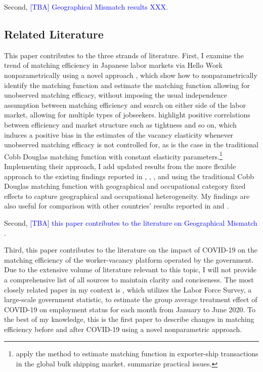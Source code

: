 \documentclass[12pt]{article}
\begin{document}
Second, \textcolor{blue}{[TBA] Geographical Mismatch results XXX}.


\subsection{Related Literature}
This paper contributes to the three strands of literature.
First, I examine the trend of matching efficiency in Japanese labor markets via Hello Work nonparametrically using a novel approach \citep{lange2020beyond}, which show how to nonparametrically identify the matching function and estimate the matching function allowing for unobserved matching efficacy, without imposing the usual independence assumption between matching efficiency and search on either side of the labor market, allowing for multiple types of jobseekers.
\cite{lange2020beyond} highlight positive correlations between efficiency and market structure such as tightness and so on, which induces a positive bias in the estimates of the vacancy elasticity whenever unobserved matching efficacy is not controlled for, as is the case in the traditional Cobb Douglas matching function with constant elasticity parameters.\footnote{\cite{brancaccio2020geography,brancaccio2023search} apply the method to estimate matching function in exporter-ship transactions in the global bulk shipping market. \cite{brancaccio2020guide} summarize practical issues.} 
Implementing their approach, I add updated results from the more flexible approach to the existing findings reported in \cite{kano2005estimating}, \cite{kambayashi2006vacancy}, \cite{sasaki2008matching}, and \cite{higashi2018spatial} using the traditional Cobb Douglas matching function with geographical and occupational category fixed effects to capture geographical and occupational heterogeneity.
My findings are also useful for comparison with other countries' results reported in \cite{bernstein2022matching} and \cite{petrongolo2001looking}.

Second, \textcolor{blue}{[TBA] this paper contributes to the literature on Geographical Mismatch \cite{csahin2014mismatch,kawata2016multi,kawata2019}}.

Third, this paper contributes to the literature on the impact of COVID-19 on the matching efficiency of the worker-vacancy platform operated by the government. 
Due to the extensive volume of literature relevant to this topic, I will not provide a comprehensive list of all sources to maintain clarity and conciseness. 
The most closely related paper in my context is \cite{fukai2021describing}, which utilizes the Labor Force Survey, a large-scale government statistic, to estimate the group average treatment effect of COVID-19 on employment status for each month from January to June 2020. 
To the best of my knowledge, this is the first paper to describe changes in matching efficiency before and after COVID-19 using a novel nonparametric approach.
\end{document}
